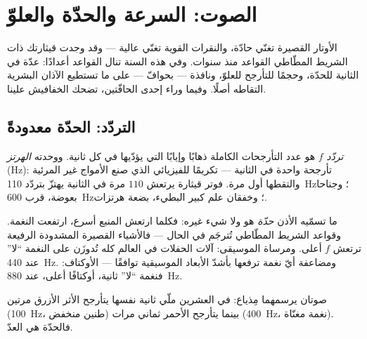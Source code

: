 \chapter{الصوت: السرعة والحدّة والعلوّ}\label{ch:g8:sound-pitch-loudness}

الأوتار القصيرة تغنّي حادّة، والنقرات القوية تغنّي عالية ---
وقد وجدت قيثارتك ذات الشريط المطّاطي القواعد منذ سنوات. وفي
هذه السنة تنال القواعد أعدادًا: عدّة في الثانية للحدّة، وحجمًا
للتأرجح للعلوّ، ونافذة --- بحوافّ --- على ما تستطيع الآذان
البشرية التقاطه أصلًا. وفيما وراء إحدى الحافّتين، تضحك
الخفافيش علينا.

\section{التردّد: الحدّة معدودةً}

\begin{definition}[التردّد]\label{def:g8:sound-pitch-loudness:frequency}
\emph{تردّد}  $f$ هو عدد التأرجحات الكاملة
ذهابًا وإيابًا التي يؤدّيها في كل ثانية. ووحدته
\emph{الهرتز} (\unit{Hz}): تأرجحة واحدة في
الثانية --- تكريمًا للفيزيائي الذي صنع الأمواج غير المرئية
والتقطها أول مرة. فوتر قيثارة يرتعش $110$ مرة في الثانية يهتزّ
بتردّد \qty{110}{Hz}؛ وجناحا بعوضة، قرب \qty{600}{Hz}؛
وخفقان علم كبير البطيء، بضعة هرتزات.
\end{definition}

\begin{proposition}\label{prop:g8:sound-pitch-loudness:pitch}
ما تسمّيه الأذن \emph{حدّة} هو  ولا شيء غيره: فكلما
ارتعش المنبع أسرع، ارتفعت النغمة. وقواعد الشريط المطّاطي
تُترجَم في الحال --- فالأشياء القصيرة المشدودة الرفيعة ترتعش
 $f$ أعلى. ومرساة الموسيقى: آلات الحفلات في العالم كله
تُدوزَن على النغمة ``لا'' عند \qty{440}{Hz}. ومضاعفة  أيّ
نغمة ترفعها بأشدّ الأبعاد الموسيقية توافقًا --- الأوكتاف:
فنغمة ``لا'' ثانية، أوكتافًا أعلى، عند \qty{880}{Hz}.
\end{proposition}

\begin{omfigure}

{\small صوتان يرسمهما مِذياع: في العشرين ملّي ثانية نفسها
يتأرجح الأثر الأزرق مرتين (\qty{100}{Hz}، طنين منخفض) بينما
يتأرجح الأحمر ثماني مرات (\qty{400}{Hz}، نغمة مغنّاة).
فالحدّة هي العدّ.}
\end{omfigure}

